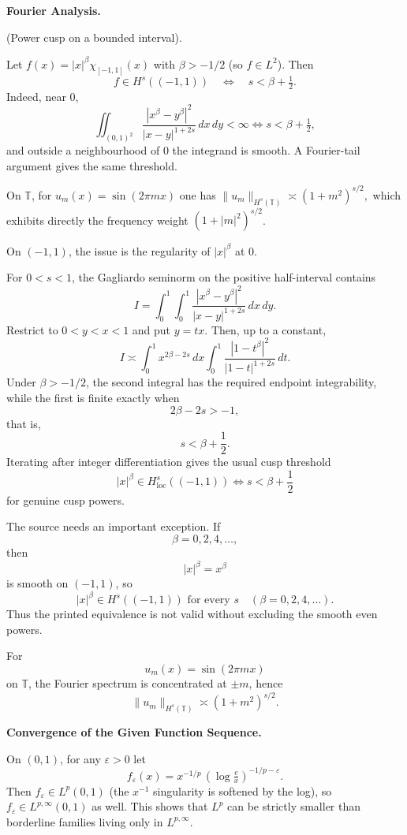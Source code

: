 \begin{problem}[CP-II-0380]
\label{prob:cp-ii-0380}
\textbf{Fourier Analysis.}

\hspace*{1.5em}(Power cusp on a bounded interval).

Let $f(x)=|x|^\beta \chi_{[-1,1]}(x)$ with $\beta>-1/2$ (so $f\in L^2$). Then
\[
f\in H^s((-1,1)) \quad\Longleftrightarrow\quad s<\beta+\tfrac12.
\]
Indeed, near $0$,
\[
\iint_{(0,1)^2}\frac{|x^\beta-y^\beta|^2}{|x-y|^{1+2s}}\,dx\,dy<\infty
\iff s<\beta+\tfrac12,
\]
and outside a neighbourhood of $0$ the integrand is smooth. A Fourier-tail argument gives the same threshold.

\bigskip

On $\mathbb T$, for $u_m(x)=\sin(2\pi m x)$ one has
\(
\|u_m\|_{H^s(\mathbb T)}\asymp (1+m^2)^{s/2},
\)
which exhibits directly the frequency weight $(1+|m|^2)^{s/2}$.
\end{problem}

\begin{solution}
On \((-1,1)\), the issue is the regularity of \(|x|^\beta\) at \(0\).

For \(0<s<1\), the Gagliardo seminorm on the positive half-interval contains
\[
I
=
\int_0^1\int_0^1
\frac{|x^\beta-y^\beta|^2}
{|x-y|^{1+2s}}\,dx\,dy.
\]
Restrict to \(0<y<x<1\) and put \(y=tx\). Then, up to a constant,
\[
I
\asymp
\int_0^1x^{2\beta-2s}\,dx
\int_0^1
\frac{|1-t^\beta|^2}
{|1-t|^{1+2s}}\,dt.
\]
Under \(\beta>-1/2\), the second integral has the required endpoint integrability, while the
first is finite exactly when
\[
2\beta-2s>-1,
\]
that is,
\[
s<\beta+\frac12.
\]
Iterating after integer differentiation gives the usual cusp threshold
\[
\boxed{
|x|^\beta\in H^s_{\mathrm{loc}}((-1,1))
\iff
s<\beta+\frac12
}
\]
for genuine cusp powers.

The source needs an important exception. If
\[
\beta=0,2,4,\ldots,
\]
then
\[
|x|^\beta=x^\beta
\]
is smooth on \((-1,1)\), so
\[
\boxed{
|x|^\beta\in H^s((-1,1))
\text{ for every }s
\quad(\beta=0,2,4,\ldots).
}
\]
Thus the printed equivalence is not valid without excluding the smooth even powers.

For
\[
u_m(x)=\sin(2\pi mx)
\]
on \(\mathbb T\), the Fourier spectrum is concentrated at \(\pm m\), hence
\[
\boxed{
\|u_m\|_{H^s(\mathbb T)}
\asymp
(1+m^2)^{s/2}.
}
\]
\end{solution}


\begin{problem}[CP-II-0381]
\label{prob:cp-ii-0381}
\textbf{Convergence of the Given Function Sequence.}

\hspace*{1.5em}On $(0,1)$, for any $\varepsilon>0$ let
	\[
	f_\varepsilon(x)=x^{-1/p}\,(\log\tfrac{e}{x})^{-1/p-\varepsilon}.
	\]
	Then $f_\varepsilon\in L^p(0,1)$
	(the $x^{-1}$ singularity is softened by the log),
	so $f_\varepsilon\in L^{p,\infty}(0,1)$ as well.
	This shows that $L^p$ can be strictly smaller
	than borderline families living only in $L^{p,\infty}$.
\end{problem}

